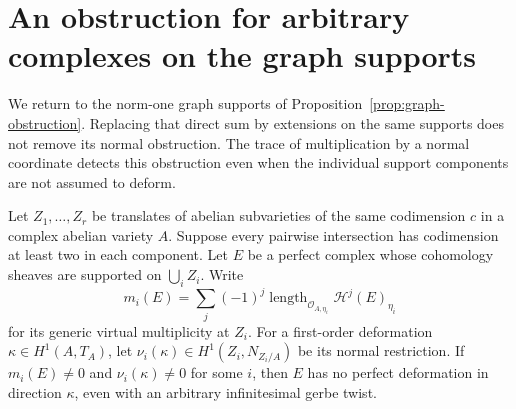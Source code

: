 \section{An obstruction for arbitrary complexes on the graph supports}
\label{sec:localized-support}
We return to the norm-one graph supports of Proposition~\ref{prop:graph-obstruction}. Replacing that direct sum by extensions on the same supports does not remove its normal obstruction. The trace of multiplication by a normal coordinate detects this obstruction even when the individual support components are not assumed to deform.

\begin{theorem}\label{thm:localized-support}
Let $Z_1,\ldots,Z_r$ be translates of abelian subvarieties of the same codimension $c$ in a complex abelian variety $A$. Suppose every pairwise intersection has codimension at least two in each component. Let $E$ be a perfect complex whose cohomology sheaves are supported on $\bigcup_iZ_i$. Write
\[
 m_i(E)=\sum_j(-1)^j
 \operatorname{length}_{\mathcal O_{A,\eta_i}}
 \mathcal H^j(E)_{\eta_i}
\]
for its generic virtual multiplicity at $Z_i$. For a first-order deformation $\kappa\in H^1(A,T_A)$, let $\nu_i(\kappa)\in H^1(Z_i,N_{Z_i/A})$ be its normal restriction. If $m_i(E)\ne0$ and $\nu_i(\kappa)\ne0$ for some $i$, then $E$ has no perfect deformation in direction $\kappa$, even with an arbitrary infinitesimal gerbe twist.
\end{theorem}

